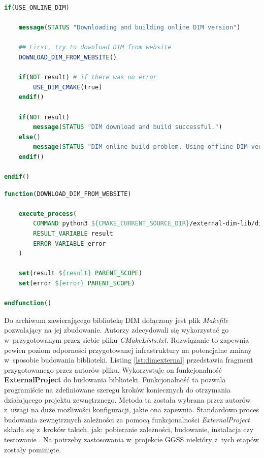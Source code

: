 \begin{lstlisting}[language=cmake, caption={Fragment pliku \textit{dim\_build.cmake} przedstawiający proces budowania nowej, pobranej ze strony internetowej wersji biblioteki DIM. Widoczne wywołania zdefiniowanych przez autorów funkcji. }, label={lst:dimonlinebuild}]
if(USE_ONLINE_DIM)

    message(STATUS "Downloading and building online DIM version")

    ## First, try to download DIM from website
    DOWNLOAD_DIM_FROM_WEBSITE()

    if(NOT result) # if there was no error
        USE_DIM_CMAKE(true)
    endif()

    if(NOT result)
        message(STATUS "DIM download and build successful.")
    else()
        message(STATUS "DIM online build problem. Using offline DIM version.")
    endif()

endif()
\end{lstlisting}

\newpage

\begin{lstlisting}[language=cmake, caption={Przykład funkcji zdefiniowanej w~skrypcie \textit{CMake}. Funkcja wykorzystuje komendę \textit{execute\_process} do wykonania skryptu pobierającego bibliotekę DIM z~jej strony internetowej.}, label={lst:dimdown}]
function(DOWNLOAD_DIM_FROM_WEBSITE)

    execute_process(
        COMMAND python3 ${CMAKE_CURRENT_SOURCE_DIR}/external-dim-lib/dim_download.py
        RESULT_VARIABLE result
        ERROR_VARIABLE error
    )

    set(result ${result} PARENT_SCOPE)
    set(error ${error} PARENT_SCOPE)

endfunction()
\end{lstlisting}

Do archiwum zawierającego bibliotekę DIM dołączony jest plik \textit{Makefile} pozwalający na jej zbudowanie. Autorzy zdecydowali się wykorzystać go w~przygotowanym przez siebie pliku \textit{CMakeLists.txt}. Rozwiązanie to zapewnia pewien poziom odporności przygotowanej infrastruktury na potencjalne zmiany w~sposobie budowania biblioteki. Listing \ref{lst:dimexternal} przedstawia fragment przygotowanego przez autorów pliku. Wykorzystuje on funkcjonalność \textbf{ExternalProject} do budowania biblioteki. Funkcjonalność ta pozwala programiście na zdefiniowane szeregu kroków koniecznych do otrzymania działającego projektu zewnętrznego. Metoda ta została wybrana przez autorów z~uwagi na duże możliwości konfiguracji, jakie ona zapewnia. Standardowo proces budowania zewnętrznych zależności za pomocą funkcjonalności \textit{ExternalProject} składa się z~kroków takich, jak: pobieranie zależności, budowanie, instalacja czy testowanie \cite{CMakeExternalProject}. Na potrzeby zastosowania w~projekcie GGSS niektóry z~tych etapów zostały pominięte. 


